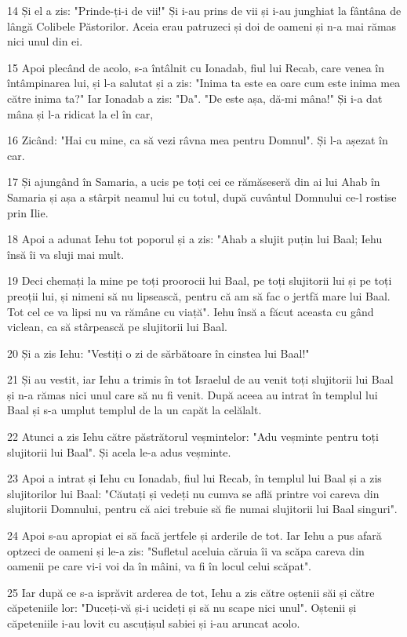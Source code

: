 \par 14 Și el a zis: "Prinde-ți-i de vii!" Și i-au prins de vii și i-au junghiat la fântâna de lângă Colibele Păstorilor. Aceia erau patruzeci și doi de oameni și n-a mai rămas nici unul din ei.
\par 15 Apoi plecând de acolo, s-a întâlnit cu Ionadab, fiul lui Recab, care venea în întâmpinarea lui, și l-a salutat și a zis: "Inima ta este ea oare cum este inima mea către inima ta?" Iar Ionadab a zis: "Da". "De este așa, dă-mi mâna!" Și i-a dat mâna și l-a ridicat la el în car,
\par 16 Zicând: "Hai cu mine, ca să vezi râvna mea pentru Domnul". Și l-a așezat în car.
\par 17 Și ajungând în Samaria, a ucis pe toți cei ce rămăseseră din ai lui Ahab în Samaria și așa a stârpit neamul lui cu totul, după cuvântul Domnului ce-l rostise prin Ilie.
\par 18 Apoi a adunat Iehu tot poporul și a zis: "Ahab a slujit puțin lui Baal; Iehu însă îi va sluji mai mult.
\par 19 Deci chemați la mine pe toți proorocii lui Baal, pe toți slujitorii lui și pe toți preoții lui, și nimeni să nu lipsească, pentru că am să fac o jertfă mare lui Baal. Tot cel ce va lipsi nu va rămâne cu viață". Iehu însă a făcut aceasta cu gând viclean, ca să stârpească pe slujitorii lui Baal.
\par 20 Și a zis Iehu: "Vestiți o zi de sărbătoare în cinstea lui Baal!"
\par 21 Și au vestit, iar Iehu a trimis în tot Israelul de au venit toți slujitorii lui Baal și n-a rămas nici unul care să nu fi venit. După aceea au intrat în templul lui Baal și s-a umplut templul de la un capăt la celălalt.
\par 22 Atunci a zis Iehu către păstrătorul veșmintelor: "Adu veșminte pentru toți slujitorii lui Baal". Și acela le-a adus veșminte.
\par 23 Apoi a intrat și Iehu cu Ionadab, fiul lui Recab, în templul lui Baal și a zis slujitorilor lui Baal: "Căutați și vedeți nu cumva se află printre voi careva din slujitorii Domnului, pentru că aici trebuie să fie numai slujitorii lui Baal singuri".
\par 24 Apoi s-au apropiat ei să facă jertfele și arderile de tot. Iar Iehu a pus afară optzeci de oameni și le-a zis: "Sufletul aceluia căruia îi va scăpa careva din oamenii pe care vi-i voi da în mâini, va fi în locul celui scăpat".
\par 25 Iar după ce s-a isprăvit arderea de tot, Iehu a zis către oștenii săi și către căpeteniile lor: "Duceți-vă și-i ucideți și să nu scape nici unul". Oștenii și căpeteniile i-au lovit cu ascuțișul sabiei și i-au aruncat acolo.
